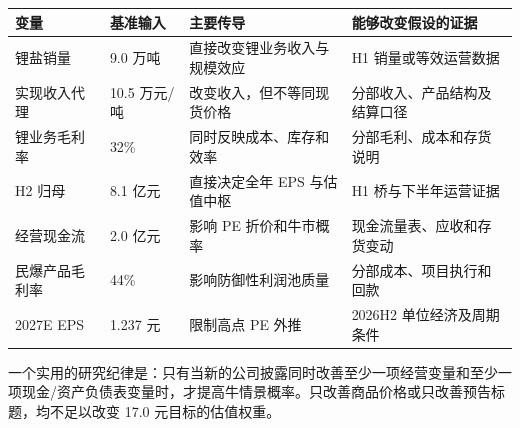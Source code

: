 \begin{exhibitbox}[表 A-6：基准情景的变量敏感性与验证要求]
\begin{tabularx}{\exhibitboxwidth}{L{3.0cm}L{2.7cm}X X}
\toprule
变量 & 基准输入 & 主要传导 & 能够改变假设的证据 \\
\midrule
锂盐销量 & 9.0 万吨 & 直接改变锂业务收入与规模效应 & H1 销量或等效运营数据 \\
实现收入代理 & 10.5 万元/吨 & 改变收入，但不等同现货价格 & 分部收入、产品结构及结算口径 \\
锂业务毛利率 & 32\% & 同时反映成本、库存和效率 & 分部毛利、成本和存货说明 \\
H2 归母 & 8.1 亿元 & 直接决定全年 EPS 与估值中枢 & H1 桥与下半年运营证据 \\
经营现金流 & 2.0 亿元 & 影响 PE 折价和牛市概率 & 现金流量表、应收和存货变动 \\
民爆产品毛利率 & 44\% & 影响防御性利润池质量 & 分部成本、项目执行和回款 \\
2027E EPS & 1.237 元 & 限制高点 PE 外推 & 2026H2 单位经济及周期条件 \\
\bottomrule
\end{tabularx}
\end{exhibitbox}

一个实用的研究纪律是：只有当新的公司披露同时改善至少一项经营变量和至少一项现金/资产负债表变量时，才提高牛情景概率。只改善商品价格或只改善预告标题，均不足以改变 17.0 元目标的估值权重。

